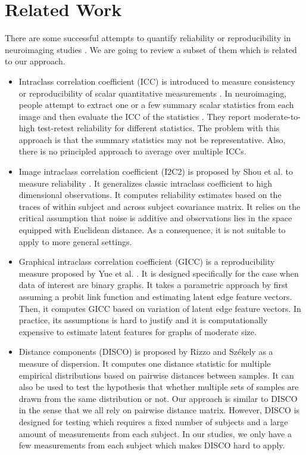 \documentclass{article}
\begin{document}
\section{Related Work}
There are some successful attempts to quantify reliability or reproducibility in neuroimaging studies \cite{shrout1979intraclass,strother2002quantitative,rizzo2010disco,zuo2010reliable,braun2012test,shou2013quantifying,yue2015estimating,yu2013stability}. We are going to review a subset of them which is related to our approach.
\begin{itemize}
	\item Intraclass correlation coefficient (ICC) is introduced to measure consistency or reproducibility of scalar quantitative measurements \cite{shrout1979intraclass}. In neuroimaging, people attempt to extract one or a few summary scalar statistics from each image and then evaluate the ICC of the statistics \cite{zuo2010reliable,braun2012test}. They report moderate-to-high test-retest reliability for different statistics. The problem with this approach is that the summary statistics may not be representative. Also, there is no principled approach to average over multiple ICCs. 
	\item Image intraclass correlation coefficient (I2C2) is proposed by Shou et al. to measure reliability  \cite{shou2013quantifying}. It generalizes classic intraclass coefficient to high dimensional observations. It computes reliability estimates based on the traces of within subject and across subject covariance matrix. It relies on the critical assumption that noise is additive and observations lies in the space equipped with Euclidean distance. As a consequence, it is not suitable to apply to more general settings. 
	\item Graphical intraclass correlation coefficient (GICC) is a reproducibility measure proposed by Yue et al. \cite{yue2015estimating}. It is designed specifically for the case when data of interest are binary graphs. It takes a parametric approach by first assuming a probit link function and estimating latent edge feature vectors. Then, it computes GICC based on variation of latent edge feature vectors. In practice, its assumptions is hard to justify and it is computationally expensive to estimate latent features for graphs of moderate size. 
	\item Distance components (DISCO) is proposed by Rizzo and Sz{\'e}kely as a measure of dispersion\cite{rizzo2010disco}. It computes one distance statistic for multiple empirical distributions based on pairwise distances between samples. It can also be used to test the hypothesis that whether multiple sets of samples are drawn from the same distribution or not. Our approach is similar to DISCO in the sense that we all rely on pairwise distance matrix. However, DISCO is designed for testing which requires a fixed number of subjects and a large amount of measurements from each subject. In our studies, we only have a few measurements from each subject which makes DISCO hard to apply.  

\end{itemize}
\end{document}

